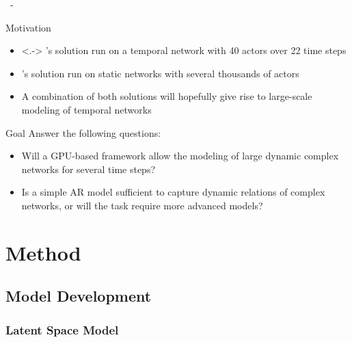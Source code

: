 \documentclass{beamer}
\newenvironment{xframe}
    {\begin{frame}{
        \ifx\insertsubsection\empty
            \strut
        \else\ifx\insertsubsubsection\empty
            \insertsection
        \else
            \insertsection~-~\insertsubsection
        \fi\fi
    }{
        \ifx\insertsubsection\empty
            \insertsection
        \else\ifx\insertsubsubsection\empty
            \insertsubsection
        \else
            \insertsubsubsection
        \fi\fi
    }}
    {\end{frame}}
\newenvironment{xblock}[1]
    {\begin{block}{#1}}
    {\end{block}}
\begin{document}
    \begin{xframe}
        \begin{xblock}{Motivation}
            \begin{itemize}
                \item<.-> \citeauthor{zangenberg2018a}'s solution run on a temporal network with 40 actors over 22 time steps
                \item \citeauthor{jacobsen2018a}'s solution run on static networks with several thousands of actors
                \item A combination of both solutions will hopefully give rise to large-scale modeling of temporal networks
            \end{itemize}
        \end{xblock}
        
        \begin{xblock}{Goal}
            Answer the following questions:
            \begin{itemize}\itshape
                \item Will a GPU-based framework allow the modeling of large dynamic complex networks for several time steps?
                \item Is a simple AR model sufficient to capture dynamic relations of complex networks, or will the task require more advanced models?
            \end{itemize}
        \end{xblock}
    \end{xframe}
    
    
\section{Method}

    \subsection{Model Development}
    
    \subsubsection{Latent Space Model}
    
\end{document}
